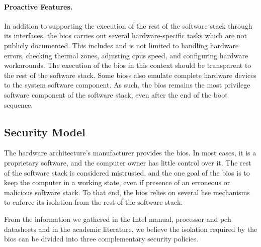 \paragraph{Proactive Features.}
%
In addition to supporting the execution of the rest of the software stack
through its interfaces, the \ac{bios} carries out several hardware-specific
tasks which are not publicly documented.
%
This includes and is not limited to handling hardware errors, checking thermal
zones, adjusting \acp{cpu} speed, and configuring hardware workarounds.
%
The execution of the \ac{bios} in this context should be transparent to the rest
of the software stack.
%
Some \acp{bios} also emulate complete hardware devices to the system software
component.
%
As such, the \ac{bios} remains the most privilege software component of the
software stack, even after the end of the boot sequence.

\subsection{Security Model}
\label{subsec:usecase:firm:sec}

The hardware architecture’s manufacturer provides the \ac{bios}.
%
In most cases, it is a proprietary software, and the computer owner has little
control over it.
%
The rest of the software stack is considered mistrusted, and the one goal of the
\ac{bios} is to keep the computer in a working state, even if presence of an
erroneous or malicious software stack.
%
To that end, the \ac{bios} relies on several \ac{hse} mechanisms to enforce its
isolation from the rest of the software stack.

%
From the information we gathered in the Intel manual, processor and \ac{pch}
datasheets and in the academic literature, we believe the isolation required by
the \ac{bios} can be divided into three complementary security policies.

